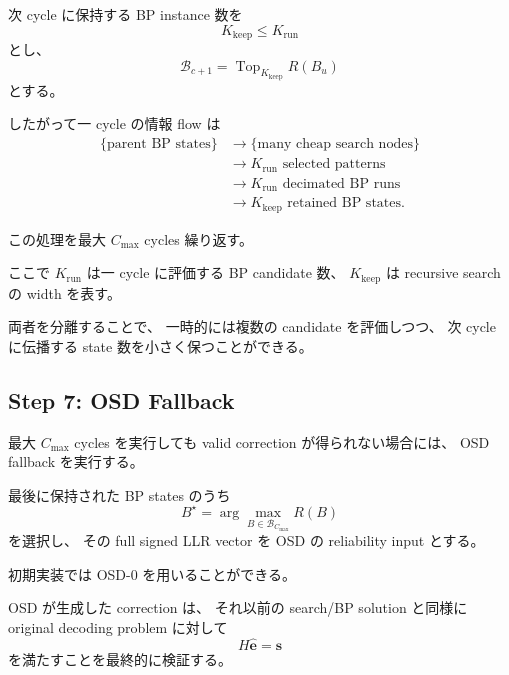 次 cycle に保持する BP instance 数を
\begin{equation}
    K_{\mathrm{keep}}
    \le
    K_{\mathrm{run}}
\end{equation}
とし、
\begin{equation}
    \boxed{
    \mathcal{B}_{c+1}
    =
    \operatorname{Top}_{K_{\mathrm{keep}}}
    R(B_u)
    }
    \label{eq:beam_retention}
\end{equation}
とする。

したがって一 cycle の情報 flow は
\begin{equation}
\begin{split}
    \{\text{parent BP states}\}
    &\longrightarrow
    \{\text{many cheap search nodes}\}
    \\
    &\longrightarrow
    K_{\mathrm{run}}\text{ selected patterns}
    \\
    &\longrightarrow
    K_{\mathrm{run}}\text{ decimated BP runs}
    \\
    &\longrightarrow
    K_{\mathrm{keep}}\text{ retained BP states}.
\end{split}
\end{equation}

この処理を最大 $C_{\max}$ cycles 繰り返す。

ここで
$K_{\mathrm{run}}$ は一 cycle に評価する BP candidate 数、
$K_{\mathrm{keep}}$ は recursive search の width を表す。

両者を分離することで、
一時的には複数の candidate を評価しつつ、
次 cycle に伝播する state 数を小さく保つことができる。


\subsection{Step 7: OSD Fallback}

最大 $C_{\max}$ cycles を実行しても valid correction が得られない場合には、
OSD fallback を実行する。

最後に保持された BP states のうち
\begin{equation}
    B^\star
    =
    \arg\max_{B\in\mathcal{B}_{C_{\max}}}
    R(B)
\end{equation}
を選択し、
その full signed LLR vector を OSD の reliability input とする。

初期実装では OSD-0 を用いることができる。

OSD が生成した correction は、
それ以前の search/BP solution と同様に
original decoding problem に対して
\begin{equation}
    H\hat{\bm e}=\bm{s}
\end{equation}
を満たすことを最終的に検証する。

